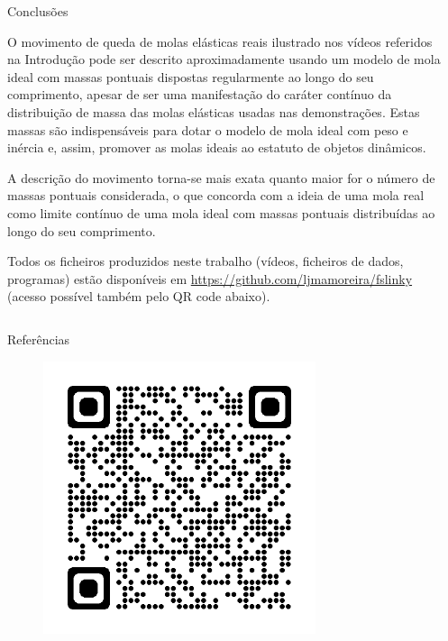\documentclass[final]{beamer}
\newlength{\sepwidth}
\newlength{\colwidth}
\newcommand{\separatorcolumn}{\begin{column}{\sepwidth}\end{column}}
\begin{document}
\begin{frame}[t,fragile]
\begin{columns}[t]
\begin{column}{\colwidth}
\begin{exampleblock}{Conclusões}

O movimento de queda de molas elásticas reais ilustrado nos vídeos referidos na
Introdução pode ser descrito aproximadamente usando um modelo de mola ideal com
massas pontuais dispostas regularmente ao longo do seu comprimento, apesar de
ser uma manifestação do caráter contínuo da distribuição de massa das molas
elásticas usadas nas demonstrações. Estas massas são indispensáveis para dotar o
modelo de mola ideal com peso e inércia e, assim, promover as molas ideais ao
estatuto de objetos dinâmicos.

A descrição do movimento torna-se mais exata quanto maior for o número de massas
pontuais considerada, o que concorda com a ideia de uma mola real como limite
contínuo de uma mola ideal com massas pontuais distribuídas ao longo do seu
comprimento. 

Todos os ficheiros produzidos neste trabalho (vídeos, ficheiros de dados, programas) estão disponíveis em \url{https://github.com/ljmamoreira/fslinky} (acesso possível também pelo QR code abaixo).

\end{exampleblock}
\end{column}
\separatorcolumn
\end{columns}



\begin{columns}[t]
\begin{column}{0.9328981723\paperwidth}
\begin{block}{Referências}
\begin{multicols}{2}
	
	\begin{multicols}{3}
	    \nocite{*}
	    \scriptsize
	    
	    
	\end{multicols} 
	
	\hfill
	
	\begin{figure}
		\centering
		\vspace*{-52.143pt}\includegraphics[height=8cm]{images/qrcode2}
	\end{figure}


\end{multicols}
\end{block}
\end{column}
\end{columns}
\end{frame}
\end{document}
